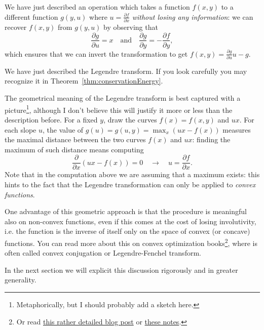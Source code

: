 \documentclass[english,fontsize=11pt,paper=b5]{scrbook}
\theoremstyle{definition}
\begin{document}
    We have just described an operation which takes a function $f(x,y)$ to a different function $g(y,u)$ where $u = \frac{\partial f}{\partial x}$ \emph{without losing any information}: we can recover $f(x,y)$ from $g(y,u)$ by observing that
    \begin{equation}
      \frac{\partial g}{\partial u} = x
      \quad\mbox{and}\quad
      \frac{\partial g}{\partial y} = - \frac{\partial f}{\partial y},
    \end{equation}
    which ensures that we can invert the transformation to get $f(x,y) = \frac{\partial g}{\partial u}u - g$.

    We have just described the Legendre transform.
    If you look carefully you may recognize it in Theorem~\ref{thm:conservationEnergy}.

    The geometrical meaning of the Legendre transform is best captured with a picture\footnote{Metaphorically, but I should probably add a sketch here.}, although I don't believe this will justify it more or less than the description before.
    For a fixed $y$, draw the curves $f(x) = f(x,y)$ and $ux$.
    For each slope $u$, the value of $g(u) = g(u,y) = \max_x (ux - f(x))$ measures the maximal distance between the two curves $f(x)$ and $ux$: finding the maximum of such distance means
    computing
    \begin{equation}
      \frac{\partial}{\partial x}(ux - f(x)) = 0 \quad\rightarrow\quad u = \frac{\partial f}{\partial x}.
    \end{equation}
    Note that in the computation above we are assuming that a maximum exists:
    this hints to the fact that the Legendre transformation can only be applied to \emph{convex functions}.

    One advantage of this geometric approach is that the procedure is meaningful also on non-convex functions, even if this comes at the cost of losing involutivity, i.e. the function is the inverse of itself only on the space of convex (or concave) functions.
    You can read more about this on convex optimization books\footnote{Or read \href{https://web.archive.org/web/20211127141805/https://jmanton.wordpress.com/2010/11/21/introduction-to-the-legendre-transform/}{this rather detailed blog post} or \href{https://web.archive.org/web/20170407134235/http://www.physics.sun.ac.za/~htouchette/archive/notes/lfth2.pdf}{these notes}.}, where is often called convex conjugation or Legendre-Fenchel transform.

    In the next section we will explicit this discussion rigorously and in greater generality.
\end{document}
